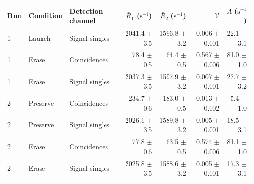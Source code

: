 \begin{tabular}{lllrrrr}
\toprule
Run & Condition & Detection channel & $\bar R_1$ ($\mathrm{s}^{-1}$) & $\bar R_2$ ($\mathrm{s}^{-1}$) & $\mathcal{V}$ & $A$ ($\mathrm{s}^{-1}$) \\
\midrule
1 & Launch & Signal singles & 2041.4 \ensuremath{\pm} 3.5 & 1596.8 \ensuremath{\pm} 3.2 & 0.006 \ensuremath{\pm} 0.001 & 22.1 \ensuremath{\pm} 3.1 \\
1 & Erase & Coincidences & 78.4 \ensuremath{\pm} 0.5 & 64.4 \ensuremath{\pm} 0.5 & 0.567 \ensuremath{\pm} 0.006 & 81.0 \ensuremath{\pm} 1.0 \\
1 & Erase & Signal singles & 2037.3 \ensuremath{\pm} 3.5 & 1597.9 \ensuremath{\pm} 3.2 & 0.007 \ensuremath{\pm} 0.001 & 23.7 \ensuremath{\pm} 3.2 \\
2 & Preserve & Coincidences & 234.7 \ensuremath{\pm} 0.6 & 183.0 \ensuremath{\pm} 0.5 & 0.013 \ensuremath{\pm} 0.002 & 5.4 \ensuremath{\pm} 1.0 \\
2 & Preserve & Signal singles & 2026.1 \ensuremath{\pm} 3.5 & 1589.8 \ensuremath{\pm} 3.2 & 0.005 \ensuremath{\pm} 0.001 & 18.5 \ensuremath{\pm} 3.1 \\
2 & Erase & Coincidences & 77.8 \ensuremath{\pm} 0.6 & 63.5 \ensuremath{\pm} 0.5 & 0.574 \ensuremath{\pm} 0.006 & 81.1 \ensuremath{\pm} 1.0 \\
2 & Erase & Signal singles & 2025.8 \ensuremath{\pm} 3.5 & 1588.6 \ensuremath{\pm} 3.2 & 0.005 \ensuremath{\pm} 0.001 & 17.3 \ensuremath{\pm} 3.1 \\
\bottomrule
\end{tabular}
